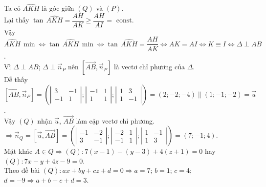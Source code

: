 \begin{bt}
{		Ta  có $\widehat{AKH}$ là góc giữa $(Q)$ và $(P)$.\\
		Lại thấy $\tan\,\widehat{AKH} = \dfrac{AH}{AK}  \ge \dfrac{AH}{AI} = \text{ const}$.\\
		Vậy $\widehat{AKH} \,\min \Leftrightarrow \tan\,\widehat{AKH} \,\min \Leftrightarrow \tan\,\widehat{AKH} = \dfrac{AH}{AK} \Leftrightarrow AK = AI \Leftrightarrow K \equiv I \Leftrightarrow \Delta  \perp AB$.\\
		Vì $\Delta \perp AB$; $\Delta \perp \overrightarrow{n}_P$ nên $[\overrightarrow{AB}, \overrightarrow{n}_P]$ là vectơ  chỉ phương của $\Delta$.\\
		Dễ thấy $\left[\overrightarrow{AB}, \overrightarrow{n}_P\right] = \left(\left| \begin{matrix} 3 & -1 \\ -1 & 1
	\end{matrix} \right|; \left| \begin{matrix} -1 & 1 \\ 1 & 1
	\end{matrix} \right|; \left| \begin{matrix} 1 & 3 \\ 1 & -1
	\end{matrix} \right|\right) = (2; -2; -4) \parallel (1; -1; -2) = \overrightarrow{u}$.\\
	Vậy $(Q)$ nhận $\overrightarrow{u}$, $\overrightarrow{AB}$  làm cặp vectơ chỉ phương.\\
	$\Rightarrow \overrightarrow{n}_Q = \left[\overrightarrow{u}, \overrightarrow{AB}\right] = \left(\left| \begin{matrix} -1 & -2 \\ 3 & -1
	\end{matrix} \right|; \left| \begin{matrix} -2 & 1 \\ -1 & 1
	\end{matrix} \right|; \left| \begin{matrix} 1 & -1 \\ 1 & 3
	\end{matrix} \right|\right) = (7; -1; 4)$.\\
	Mặt khác $A \in Q \Rightarrow (Q)\colon 7(x-1) - (y-3) + 4(z+1) = 0$ hay $(Q)\colon 7x - y + 4z - 9 =  0$.\\
	Theo đề bài $(Q)\colon ax+by+cz+d=0 \Rightarrow a=7$; $b=1$; $c=4$; $d=-9 \Rightarrow  a+b+c+d = 3$.
 }
\end{bt}

